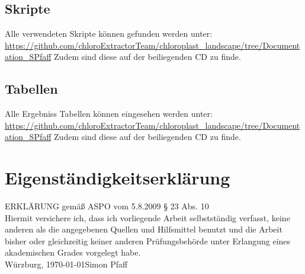 \documentclass{scrartcl}
\begin{document}
\subsection{Skripte}
\label{sec-7-3}
Alle verwendeten Skripte können gefunden werden unter:
\\
\url{https://github.com/chloroExtractorTeam/chloroplast_landscape/tree/Documentation_SPfaff}
Zudem sind diese auf der beiliegenden CD zu finde.
\subsection{Tabellen}
\label{sec-7-4}
Alle Ergebniss Tabellen können eingesehen werden unter: 
\\
\url{https://github.com/chloroExtractorTeam/chloroplast_landscape/tree/Documentation_SPfaff}
Zudem sind diese auf der beiliegenden CD zu finde.
\clearpage
\section*{Eigenständigkeitserklärung}
ERKLÄRUNG gemäß ASPO vom 5.8.2009 § 23 Abs. 10\\[10mm]
Hiermit versichere ich, dass ich vorliegende Arbeit selbstständig verfasst, keine anderen als
die angegebenen Quellen und Hilfsmittel benutzt und die Arbeit bisher oder gleichzeitig
keiner anderen Prüfungsbehörde unter Erlangung eines akademischen Grades
vorgelegt habe.\\[20mm]
Würzburg, \today \hfill Simon Pfaff
\clearpage
\end{document}
